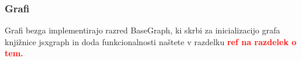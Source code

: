 \documentclass[isrm2, tisk]{fmfdelo}
\newcommand{\mycomment}[1]{\textbf{\textcolor{red}{#1}}}
\begin{document}
 \subsubsection{Grafi}
    Grafi bezga implementirajo razred BaseGraph, ki skrbi za inicializacijo grafa knjižnice jsxgraph in doda funkcionalnosti naštete v razdelku \mycomment{ref na razdelek o tem.}


%
%
%
\end{document}
